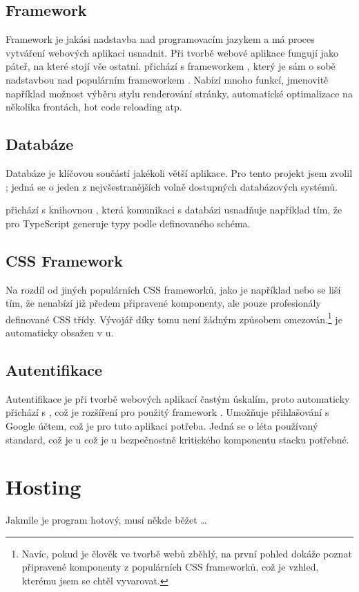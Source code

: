 \subsection{Framework}

Framework je jakási nadstavba nad programovacím jazykem a má proces vytváření webových aplikací usnadnit. Při tvorbě webové aplikace fungují jako páteř, na které stojí vše ostatní.  přichází s frameworkem , který je sám o sobě nadstavbou nad populárním frameworkem . Nabízí mnoho funkcí, jmenovitě například možnost výběru stylu renderování stránky, automatické optimalizace na několika frontách, hot code reloading atp.\cite{nextjs}

\subsection{Databáze}

Databáze je klíčovou součástí jakékoli větší aplikace. Pro tento projekt jsem zvolil ; jedná se o jeden z nejvšestranějších volně dostupných databázových systémů.

 přichází s knihovnou , která komunikaci s databázi usnadňuje například tím, že pro TypeScript generuje typy podle definovaného schéma.

\subsection{CSS Framework}

Na rozdíl od jiných populárních CSS frameworků, jako je například  nebo  se  liší tím, že nenabízí již předem připravené komponenty, ale pouze profesionály definované CSS třídy. Vývojář díky tomu není žádným způsobem omezován.\footnote{Navíc, pokud je člověk ve tvorbě webů zběhlý, na první pohled dokáže poznat připravené komponenty z populárních CSS frameworků, což je vzhled, kterému jsem se chtěl vyvarovat.}  je automaticky obsažen v u.

\subsection{Autentifikace}

Autentifikace je při tvorbě webových aplikací častým úskalím, proto  automaticky přichází s , což je rozšíření pro použitý framework . Umožňuje přihlašování s Google účtem, což je pro tuto aplikaci potřeba. Jedná se o léta používaný standard, což je u což je u bezpečnostně kritického komponentu stacku potřebné.

\section{Hosting}

Jakmile je program hotový, musí někde běžet \dots